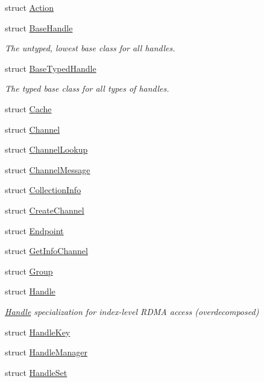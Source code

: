 \begin{DoxyCompactItemize}
\item 
struct \hyperlink{structvt_1_1rdma_1_1_action}{Action}
\item 
struct \hyperlink{structvt_1_1rdma_1_1_base_handle}{Base\+Handle}
\begin{DoxyCompactList}\small\item\em The untyped, lowest base class for all handles. \end{DoxyCompactList}\item 
struct \hyperlink{structvt_1_1rdma_1_1_base_typed_handle}{Base\+Typed\+Handle}
\begin{DoxyCompactList}\small\item\em The typed base class for all types of handles. \end{DoxyCompactList}\item 
struct \hyperlink{structvt_1_1rdma_1_1_cache}{Cache}
\item 
struct \hyperlink{structvt_1_1rdma_1_1_channel}{Channel}
\item 
struct \hyperlink{structvt_1_1rdma_1_1_channel_lookup}{Channel\+Lookup}
\item 
struct \hyperlink{structvt_1_1rdma_1_1_channel_message}{Channel\+Message}
\item 
struct \hyperlink{structvt_1_1rdma_1_1_collection_info}{Collection\+Info}
\item 
struct \hyperlink{structvt_1_1rdma_1_1_create_channel}{Create\+Channel}
\item 
struct \hyperlink{structvt_1_1rdma_1_1_endpoint}{Endpoint}
\item 
struct \hyperlink{structvt_1_1rdma_1_1_get_info_channel}{Get\+Info\+Channel}
\item 
struct \hyperlink{structvt_1_1rdma_1_1_group}{Group}
\item 
struct \hyperlink{structvt_1_1rdma_1_1_handle}{Handle}
\begin{DoxyCompactList}\small\item\em \hyperlink{structvt_1_1rdma_1_1_handle}{Handle} specialization for index-\/level R\+D\+MA access (overdecomposed) \end{DoxyCompactList}\item 
struct \hyperlink{structvt_1_1rdma_1_1_handle_key}{Handle\+Key}
\item 
struct \hyperlink{structvt_1_1rdma_1_1_handle_manager}{Handle\+Manager}
\item 
struct \hyperlink{structvt_1_1rdma_1_1_handle_set}{Handle\+Set}

\end{DoxyCompactItemize}
